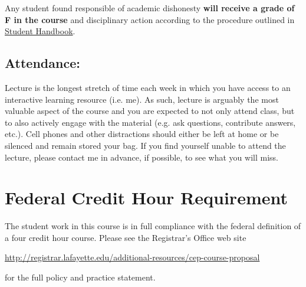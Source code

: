 \documentclass[10pt]{amsart}
\begin{document}
Any student found responsible of academic dishonesty \textbf{will receive a grade of F in the course} and disciplinary action according to the procedure outlined in \href{https://conduct.lafayette.edu/wp-content/uploads/sites/93/2018/08/StudentHandboook-2018-19.pdf}{Student Handbook}.

\subsection*{Attendance:}
Lecture is the longest stretch of time each week in which you have access to an interactive learning resource (i.e. me).
As such, lecture is arguably the most valuable aspect of the course and you are expected to not only attend class, but to also actively engage with the material (e.g. ask questions, contribute answers, etc.).
Cell phones and other distractions should either be left at home or be silenced and remain stored your bag.
If you find yourself unable to attend the lecture, please contact me in advance, if possible, to see what you will miss.

\section*{Federal Credit Hour Requirement}
The student work in this course is in full compliance with the federal definition of a four credit hour course.
Please see the Registrar's Office web site
\begin{center}
  \url{http://registrar.lafayette.edu/additional-resources/cep-course-proposal}
\end{center}
for the full policy and practice statement.
\end{document}
